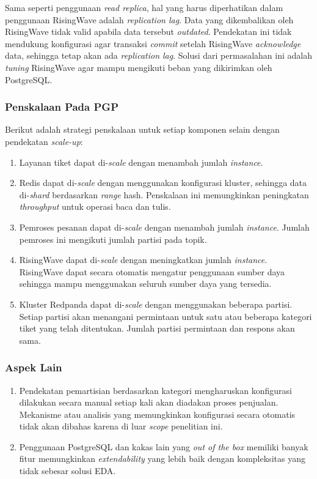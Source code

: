 Sama seperti penggunaan \textit{read replica}, hal yang harus diperhatikan dalam penggunaan RisingWave adalah \textit{replication lag}. Data yang dikembalikan oleh RisingWave tidak valid apabila data tersebut \textit{outdated}. Pendekatan ini tidak mendukung konfigurasi agar transaksi \textit{commit} setelah RisingWave \textit{acknowledge} data, sehingga tetap akan ada \textit{replication lag}. Solusi dari permasalahan ini adalah \textit{tuning} RisingWave agar mampu mengikuti beban yang dikirimkan oleh PostgreSQL.

\subsubsection{Penskalaan Pada PGP}

Berikut adalah strategi penskalaan untuk setiap komponen selain dengan pendekatan \textit{scale-up}:

\begin{enumerate}
    \item Layanan tiket dapat di-\textit{scale} dengan menambah jumlah \textit{instance}.
    \item Redis dapat di-\textit{scale} dengan menggunakan konfigurasi kluster, sehingga data di-\textit{shard} berdasarkan \textit{range} hash. Penskalaan ini memungkinkan peningkatan \textit{throughput} untuk operasi baca dan tulis.
    \item Pemroses pesanan dapat di-\textit{scale} dengan menambah jumlah \textit{instance}. Jumlah pemroses ini mengikuti jumlah partisi pada topik.
    \item RisingWave dapat di-\textit{scale} dengan meningkatkan jumlah \textit{instance}. RisingWave dapat secara otomatis mengatur penggunaan sumber daya sehingga mampu menggunakan seluruh sumber daya yang tersedia.
    \item Kluster Redpanda dapat di-\textit{scale} dengan menggunakan beberapa partisi. Setiap partisi akan menangani permintaan untuk satu atau beberapa kategori tiket yang telah ditentukan. Jumlah partisi permintaan dan respons akan sama.
\end{enumerate}

\subsubsection{Aspek Lain}

\begin{enumerate}
    \item Pendekatan pemartisian berdasarkan kategori mengharuskan konfigurasi dilakukan secara manual setiap kali akan diadakan proses penjualan. Mekanisme atau analisis yang memungkinkan konfigurasi secara otomatis tidak akan dibahas karena di luar \textit{scope} penelitian ini.
    \item Penggunaan PostgreSQL dan kakas lain yang \textit{out of the box} memiliki banyak fitur memungkinkan \textit{extendability} yang lebih baik dengan kompleksitas yang tidak sebesar solusi EDA.
\end{enumerate}